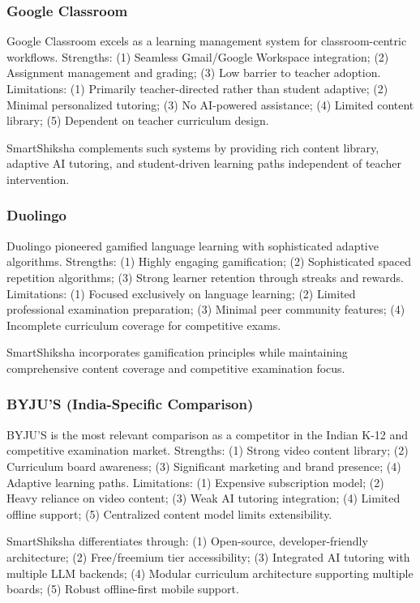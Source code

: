 \documentclass[10pt,conference,compsocconf]{IEEEtran}
\begin{document}
\subsubsection{Google Classroom}

Google Classroom excels as a learning management system for classroom-centric workflows. Strengths: (1) Seamless Gmail/Google Workspace integration; (2) Assignment management and grading; (3) Low barrier to teacher adoption. Limitations: (1) Primarily teacher-directed rather than student adaptive; (2) Minimal personalized tutoring; (3) No AI-powered assistance; (4) Limited content library; (5) Dependent on teacher curriculum design.

SmartShiksha complements such systems by providing rich content library, adaptive AI tutoring, and student-driven learning paths independent of teacher intervention.

\subsubsection{Duolingo}

Duolingo pioneered gamified language learning with sophisticated adaptive algorithms. Strengths: (1) Highly engaging gamification; (2) Sophisticated spaced repetition algorithms; (3) Strong learner retention through streaks and rewards. Limitations: (1) Focused exclusively on language learning; (2) Limited professional examination preparation; (3) Minimal peer community features; (4) Incomplete curriculum coverage for competitive exams.

SmartShiksha incorporates gamification principles while maintaining comprehensive content coverage and competitive examination focus.

\subsubsection{BYJU'S (India-Specific Comparison)}

BYJU'S is the most relevant comparison as a competitor in the Indian K-12 and competitive examination market. Strengths: (1) Strong video content library; (2) Curriculum board awareness; (3) Significant marketing and brand presence; (4) Adaptive learning paths. Limitations: (1) Expensive subscription model; (2) Heavy reliance on video content; (3) Weak AI tutoring integration; (4) Limited offline support; (5) Centralized content model limits extensibility.

SmartShiksha differentiates through: (1) Open-source, developer-friendly architecture; (2) Free/freemium tier accessibility; (3) Integrated AI tutoring with multiple LLM backends; (4) Modular curriculum architecture supporting multiple boards; (5) Robust offline-first mobile support.
\end{document}
